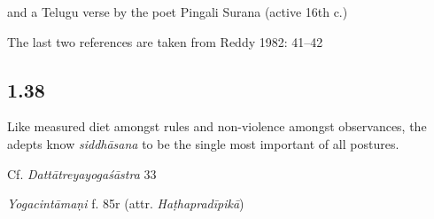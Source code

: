 \begin{ekdosis}
\begin{testimonia}[hp01_037]
and a Telugu verse by the poet Pingali Surana (active 16th c.)

\begin{versinnote}
\end{versinnote}

The last two references are taken from Reddy 1982: 41–42

\end{testimonia}

\subsection*{1.38}
\begin{translation}[hp01_038]
Like measured diet amongst rules and non-violence amongst observances, the adepts know \emph{siddhāsana} to be the single most important of all postures.
\end{translation}

\begin{sources}[hp01_038]
Cf. \emph{Dattātreyayogaśāstra} 33

\begin{versinnote}
\end{versinnote}

\end{sources}

\begin{testimonia}[hp01_038]
\emph{Yogacintāmaṇi} f. 85r (attr. \emph{Haṭhapradīpikā})

\begin{versinnote}
\end{versinnote}

\end{testimonia}

\begin{philcomm}[hp01_038]


\end{philcomm}
\end{ekdosis}
